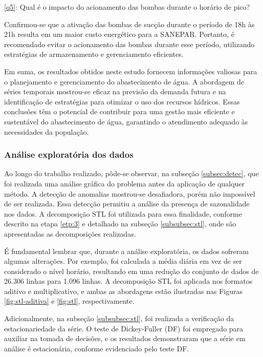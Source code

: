 \ref{q5}: Qual é o impacto do acionamento das bombas durante o horário de pico?

Confirmou-se que a ativação das bombas de sucção durante o período de 18h às 21h resulta em um maior custo energético para a SANEPAR. Portanto, é recomendado evitar o acionamento das bombas durante esse período, utilizando estratégias de armazenamento e gerenciamento eficientes.

Em suma, os resultados obtidos neste estudo fornecem informações valiosas para o planejamento e gerenciamento do abastecimento de água. A abordagem de séries temporais mostrou-se eficaz na previsão da demanda futura e na identificação de estratégias para otimizar o uso dos recursos hídricos. Essas conclusões têm o potencial de contribuir para uma gestão mais eficiente e sustentável do abastecimento de água, garantindo o atendimento adequado às necessidades da população.



\subsubsection{An\'alise explorat\'oria dos dados}


Ao longo do trabalho realizado, pôde-se observar, na subseção \ref{subsec:detec}, que foi realizada uma análise gráfica do problema antes da aplicação de qualquer método. A detecção de anomalias mostrou-se desafiadora, porém não impossível de ser realizada. Essa detecção permitiu a análise da presença de sazonalidade nos dados. A decomposição STL foi utilizada para essa finalidade, conforme descrito na etapa \ref{etp:3} e detalhado na subseção \ref{subsubsec:stl}, onde são apresentadas as decomposições realizadas.

É fundamental lembrar que, durante a análise exploratória, os dados sofreram algumas alterações. Por exemplo, foi calculada a média diária em vez de ser considerado o nível horário, resultando em uma redução do conjunto de dados de 26.306 linhas para 1.096 linhas. A decomposição STL foi aplicada nos formatos aditivo e multiplicativo, e ambas as abordagens estão ilustradas nas Figuras \ref{fig:stl-aditiva} e \ref{fig:stl}, respectivamente.

Adicionalmente, na subseção \ref{subsubsec:stl}, foi realizada a verificação da estacionariedade da série. O teste de Dickey-Fuller (DF) foi empregado para auxiliar na tomada de decisões, e os resultados demonstraram que a série em análise é estacionária, conforme evidenciado pelo teste DF.

